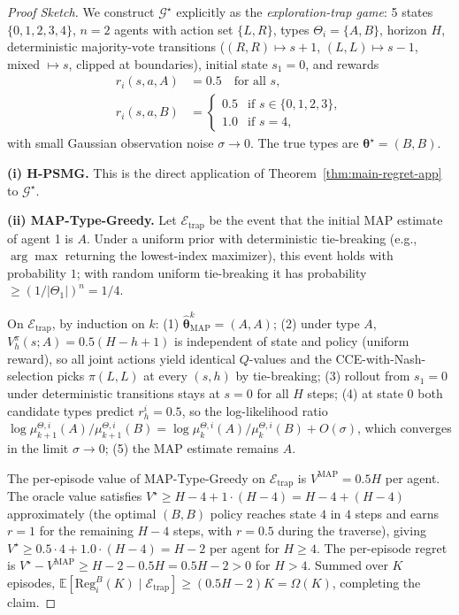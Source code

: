 \begin{proof}[Proof Sketch]
We construct $\mathcal{G}^\star$ explicitly as the \emph{exploration-trap game}: 5 states $\{0, 1, 2, 3, 4\}$, $n = 2$ agents with action set $\{L, R\}$, types $\Theta_i = \{A, B\}$, horizon $H$, deterministic majority-vote transitions ($(R, R) \mapsto s+1$, $(L, L) \mapsto s-1$, mixed $\mapsto s$, clipped at boundaries), initial state $s_1 = 0$, and rewards
\begin{align}
r_i(s, a, A) &= 0.5 \quad \text{for all } s, \\
r_i(s, a, B) &= \begin{cases} 0.5 & \text{if } s \in \{0, 1, 2, 3\}, \\ 1.0 & \text{if } s = 4, \end{cases}
\end{align}
with small Gaussian observation noise $\sigma \to 0$. The true types are $\boldsymbol{\theta}^\star = (B, B)$.

\textbf{(i) H-PSMG.} This is the direct application of Theorem~\ref{thm:main-regret-app} to $\mathcal{G}^\star$.

\textbf{(ii) MAP-Type-Greedy.} Let $\mathcal{E}_{\mathrm{trap}}$ be the event that the initial MAP estimate of agent 1 is $A$. Under a uniform prior with deterministic tie-breaking (e.g., $\arg\max$ returning the lowest-index maximizer), this event holds with probability $1$; with random uniform tie-breaking it has probability $\geq (1/|\Theta_1|)^n = 1/4$.

On $\mathcal{E}_{\mathrm{trap}}$, by induction on $k$: (1) $\hat{\boldsymbol{\theta}}_{\mathrm{MAP}}^k = (A, A)$; (2) under type $A$, $V_h^{\pi}(s; A) = 0.5(H-h+1)$ is independent of state and policy (uniform reward), so all joint actions yield identical $Q$-values and the CCE-with-Nash-selection picks $\pi(L, L)$ at every $(s, h)$ by tie-breaking; (3) rollout from $s_1 = 0$ under deterministic transitions stays at $s = 0$ for all $H$ steps; (4) at state $0$ both candidate types predict $r_h^i = 0.5$, so the log-likelihood ratio $\log \mu_{k+1}^{\Theta,i}(A) / \mu_{k+1}^{\Theta,i}(B) = \log \mu_k^{\Theta,i}(A) / \mu_k^{\Theta,i}(B) + O(\sigma)$, which converges in the limit $\sigma \to 0$; (5) the MAP estimate remains $A$.

The per-episode value of MAP-Type-Greedy on $\mathcal{E}_{\mathrm{trap}}$ is $V^{\mathrm{MAP}} = 0.5 H$ per agent. The oracle value satisfies $V^\star \geq H - 4 + 1 \cdot (H - 4) = H - 4 + (H - 4)$ approximately (the optimal $(B, B)$ policy reaches state $4$ in $4$ steps and earns $r = 1$ for the remaining $H - 4$ steps, with $r = 0.5$ during the traverse), giving $V^\star \geq 0.5 \cdot 4 + 1.0 \cdot (H - 4) = H - 2$ per agent for $H \geq 4$. The per-episode regret is $V^\star - V^{\mathrm{MAP}} \geq H - 2 - 0.5 H = 0.5 H - 2 > 0$ for $H > 4$. Summed over $K$ episodes, $\mathbb{E}[\mathrm{Reg}_i^B(K) \mid \mathcal{E}_{\mathrm{trap}}] \geq (0.5 H - 2) K = \Omega(K)$, completing the claim.


\end{proof}
